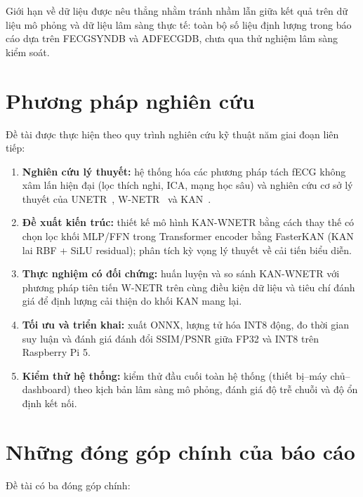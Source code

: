 \documentclass[../DoAn.tex]{subfiles}
\begin{document}
Giới hạn về dữ liệu được nêu thẳng nhằm tránh nhầm lẫn giữa kết quả trên dữ liệu mô phỏng và dữ liệu lâm sàng thực tế: toàn bộ số liệu định lượng trong báo cáo dựa trên FECGSYNDB và ADFECGDB, chưa qua thử nghiệm lâm sàng kiểm soát.

\section{Phương pháp nghiên cứu}
\label{section:1.5}

Đề tài được thực hiện theo quy trình nghiên cứu kỹ thuật năm giai đoạn liên tiếp:

\begin{enumerate}
  \item \textbf{Nghiên cứu lý thuyết:} hệ thống hóa các phương pháp tách fECG không xâm lấn hiện đại (lọc thích nghi, ICA, mạng học sâu) và nghiên cứu cơ sở lý thuyết của UNETR~\cite{hatamizadehUNETRTransformers3D2021}, W-NETR~\cite{almadaniOneDimensionalWNETRNonInvasive2023} và KAN~\cite{liuKANKolmogorovArnoldNetworks2025}.
  \item \textbf{Đề xuất kiến trúc:} thiết kế mô hình KAN-WNETR bằng cách thay thế có chọn lọc khối MLP/FFN trong Transformer encoder bằng FasterKAN (KAN lai RBF + SiLU residual); phân tích kỳ vọng lý thuyết về cải tiến biểu diễn.
  \item \textbf{Thực nghiệm có đối chứng:} huấn luyện và so sánh KAN-WNETR với phương pháp tiên tiến W-NETR trên cùng điều kiện dữ liệu và tiêu chí đánh giá để định lượng cải thiện do khối KAN mang lại.
  \item \textbf{Tối ưu và triển khai:} xuất ONNX, lượng tử hóa INT8 động, đo thời gian suy luận và đánh giá đánh đổi SSIM/PSNR giữa FP32 và INT8 trên Raspberry Pi 5.
  \item \textbf{Kiểm thử hệ thống:} kiểm thử đầu cuối toàn hệ thống (thiết bị--máy chủ--dashboard) theo kịch bản lâm sàng mô phỏng, đánh giá độ trễ chuỗi và độ ổn định kết nối.
\end{enumerate}

\section{Những đóng góp chính của báo cáo}
\label{section:1.6}

Đề tài có ba đóng góp chính:
\end{document}
